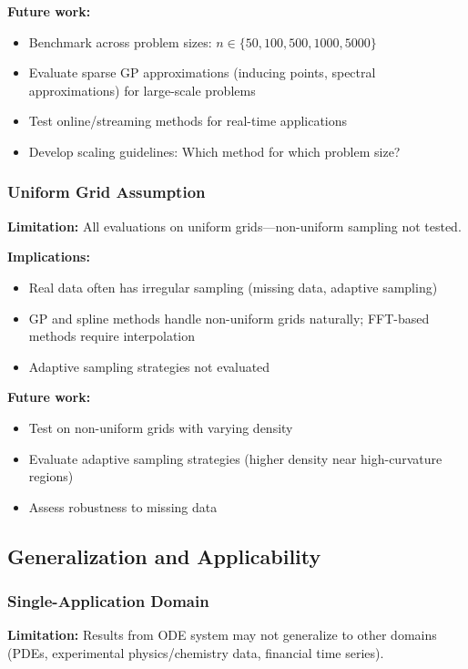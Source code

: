 \textbf{Future work:}
\begin{itemize}
    \item Benchmark across problem sizes: $n \in \{50, 100, 500, 1000, 5000\}$
    \item Evaluate sparse GP approximations (inducing points, spectral approximations) for large-scale problems
    \item Test online/streaming methods for real-time applications
    \item Develop scaling guidelines: Which method for which problem size?
\end{itemize}

\subsubsection{Uniform Grid Assumption}

\textbf{Limitation:} All evaluations on uniform grids—non-uniform sampling not tested.

\textbf{Implications:}
\begin{itemize}
    \item Real data often has irregular sampling (missing data, adaptive sampling)
    \item GP and spline methods handle non-uniform grids naturally; FFT-based methods require interpolation
    \item Adaptive sampling strategies not evaluated
\end{itemize}

\textbf{Future work:}
\begin{itemize}
    \item Test on non-uniform grids with varying density
    \item Evaluate adaptive sampling strategies (higher density near high-curvature regions)
    \item Assess robustness to missing data
\end{itemize}

\subsection{Generalization and Applicability}

\subsubsection{Single-Application Domain}

\textbf{Limitation:} Results from ODE system may not generalize to other domains (PDEs, experimental physics/chemistry data, financial time series).

